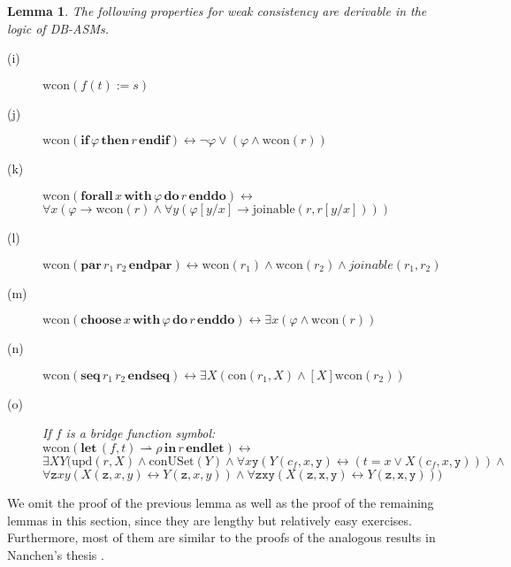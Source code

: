\documentclass[preprint,11pt]{elsarticle}
\newtheorem{lemma}[theorem]{Lemma}
\theoremstyle{definition}
\theoremstyle{remark}
\begin{document}
\begin{lemma}\label{lem-soundness-consistency}
The following properties for weak consistency are derivable in the
logic of DB-ASMs.
\begin{description}
  \item[(i)] $\mathrm{wcon}(f(t):=s)$

  \item[(j)] $\mathrm{wcon}(\textbf{if}\, \varphi\, \textbf{then}\, r \,\textbf{endif}) \leftrightarrow \neg\varphi\vee(\varphi\wedge \mathrm{wcon}(r))$

  \item[(k)] $\mathrm{wcon}(\textbf{forall} \, x \, \textbf{with} \, \varphi \, \textbf{do} \, r \, \textbf{enddo}) \leftrightarrow$\\
    \hspace*{4.5cm}$\forall x (\varphi\rightarrow \mathrm{wcon}(r) \wedge \forall y (\varphi[y/x]\rightarrow \text{joinable}(r,r[y/x])))$
\item[(l)] $\mathrm{wcon}(\textbf{par} \, r_1 \, r_2 \, \textbf{endpar}) \leftrightarrow \mathrm{wcon}(r_1) \wedge \mathrm{wcon}(r_2) \wedge joinable(r_1,r_2)$
  \item[(m)] $\mathrm{wcon}(\textbf{choose} \, x \, \textbf{with} \, \varphi \, \textbf{do} \, r \, \textbf{enddo}) \leftrightarrow \exists x (\varphi\wedge \mathrm{wcon}(r))$
  \item[(n)] $\mathrm{wcon}(\textbf{seq} \, r_1 \, r_2 \, \textbf{endseq}) \leftrightarrow \exists X (\mathrm{con}(r_1,X) \wedge [X]\mathrm{wcon}(r_2))$
  \item[(o)] If $f$ is a bridge function symbol: \\
$\mathrm{wcon}(\textbf{let} \, (f,t) \!\rightharpoonup\! \rho \, \textbf{in} \, r \,\textbf{endlet}) \leftrightarrow$\\
\hspace*{1.3cm}$\exists X Y (\mathrm{upd}(r,X) \wedge \mathrm{conUSet}(Y) \wedge \forall x \mathtt{y} (Y(c_f,x,\mathtt{y}) \leftrightarrow (t = x \vee X(c_f,x,\mathtt{y}))) \wedge $\\
\hspace*{2cm}   $\forall \mathtt{z} x y (X(\mathtt{z},x,y) \leftrightarrow Y(\mathtt{z},x,y)) \wedge \forall \mathtt{z} \mathtt{x} \mathtt{y} (X(\mathtt{z},\mathtt{x},\mathtt{y}) \leftrightarrow Y(\mathtt{z},\mathtt{x},\mathtt{y})))$
\end{description}
\end{lemma}
We omit the proof of the previous lemma as well as the proof of the remaining lemmas in this section, since they are lengthy but relatively easy exercises. Furthermore, most of them are similar to the proofs of the analogous results in Nanchen's thesis \cite{Nanchen07}. 
\end{document}
